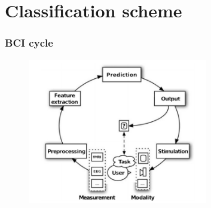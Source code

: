 \documentclass{beamer}
\begin{document}
\section{Classification scheme}

\begin{frame}
  \frametitle{BCI cycle}
  \begin{figure}
    \centering
    \includegraphics[width=0.7\textwidth]{bci_cycle.png}
  \end{figure}
 
\end{frame}
\end{document}
